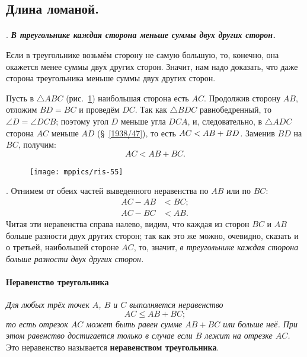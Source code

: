 \subsection*{Длина ломаной.}

\paragraph{}\label{1938/50}
.
\textbf{\emph{В треугольнике каждая сторона меньше суммы двух других сторон.}}

Если в треугольнике возьмём сторону не самую большую, то, конечно, она окажется менее суммы двух других сторон.
Значит, нам надо доказать, что даже  сторона треугольника меньше суммы двух других сторон.

Пусть в $\triangle ABC$ (рис.~\ref{1938/ris-55}) наибольшая сторона есть $AC$.
Продолжив сторону $AB$, отложим $BD=BC$ и проведём $DC$.
Так как $\triangle BDC$ равнобедренный, то $\angle D = \angle DCB$;
поэтому угол $D$ меньше угла $DCA$, и, следовательно, в $\triangle ADC$ сторона $AC$ меньше $AD$ (§~\ref{1938/47}), то есть
$AC \z< AB + BD$.
Заменив $BD$ на $BC$, получим:
\[AC < AB + BC.\]

\begin{figure}
\vskip-8mm
\centering
\texttt{[image: mppics/ris-55]}
\caption{}\label{1938/ris-55}
\end{figure}

\smallskip
\mbox{.}
Отнимем от обеих частей выведенного неравенства по $AB$ или по $BC$:
\begin{align*}
AC-AB&<BC;
\\
AC-BC&<AB.
\end{align*}
Читая эти неравенства справа налево, видим, что каждая из сторон $BC$ и $AB$ больше разности двух других сторон;
так как это же можно, очевидно, сказать и о третьей, наибольшей стороне $AC$, то, значит, \emph{в треугольнике каждая сторона больше разности двух других сторон.}


\paragraph{Неравенство треугольника}\label{extra/3inq}
\emph{Для любых трёх точек $A$, $B$ и $C$ выполняется неравенство
\[AC \le AB + BC;\]
то есть отрезок $AC$ может быть равен сумме $AB + BC$ или больше неё.
При этом равенство достигается только в случае если $B$ лежит на отрезке $AC$.}
Это неравенство называется \textbf{неравенством треугольника}.

